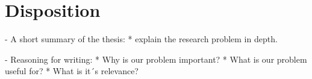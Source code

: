 \section{Disposition}
 - A short summary of the thesis:
    * explain the research problem in depth.
    
 - Reasoning for writing:
    * Why is our problem important?
    * What is our problem useful for?
    * What is it´s relevance?

 
